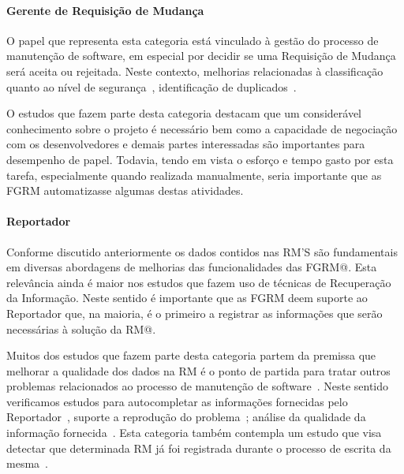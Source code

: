 \paragraph{Gerente de Requisição de	Mudança} O papel que representa esta
categoria está vinculado à gestão do processo de manutenção de software, em
especial por decidir se uma Requisição de Mudança será aceita ou rejeitada.
Neste contexto, melhorias relacionadas à classificação quanto ao nível de
segurança~\cite{gegick2010identifying, zhang2011bug,
	ValdiviaGarcia:2014:CPB:2597073.2597099}, identificação de
duplicados~\cite{hindle2016contextual, sun2010discriminative,
	alipour2013contextual, banerjee2012automated}. 

O estudos que fazem parte desta categoria destacam que um considerável
conhecimento sobre o projeto é necessário bem como  a capacidade de negociação
com os desenvolvedores e demais partes interessadas são importantes para
desempenho de papel. Todavia, tendo em vista o esforço e tempo gasto por esta
tarefa, especialmente quando realizada manualmente, seria importante que as FGRM
automatizasse algumas destas atividades.

\paragraph{Reportador} Conforme discutido anteriormente os dados contidos nas
RM'S são fundamentais em diversas abordagens de melhorias das funcionalidades
das FGRM@. Esta relevância ainda é maior nos estudos que fazem uso de técnicas
de Recuperação da Informação. Neste sentido é importante que as FGRM deem
suporte ao Reportador que, na maioria, é o primeiro a registrar as informações
que serão necessárias à solução da RM@. 

Muitos dos estudos que fazem parte desta categoria  partem da premissa que
melhorar a qualidade dos dados na RM é o ponto de partida para tratar outros
problemas relacionados ao processo de manutenção de
software~\cite{moran2015auto, Moran:2015:EAA:2786805.2807557, Bettenburg2008a}.
Neste sentido verificamos estudos para autocompletar as informações fornecidas
pelo Reportador~\cite{moran2015auto}, suporte a reprodução do
problema~\cite{Moran:2015:EAA:2786805.2807557}; análise da qualidade da
informação fornecida~\cite{Bettenburg2008a, Tu:2014:MQI:2677832.2677844}. Esta
categoria também contempla um estudo que visa detectar que determinada RM já foi
registrada durante o processo de escrita da mesma~\cite{Thung2014}.


